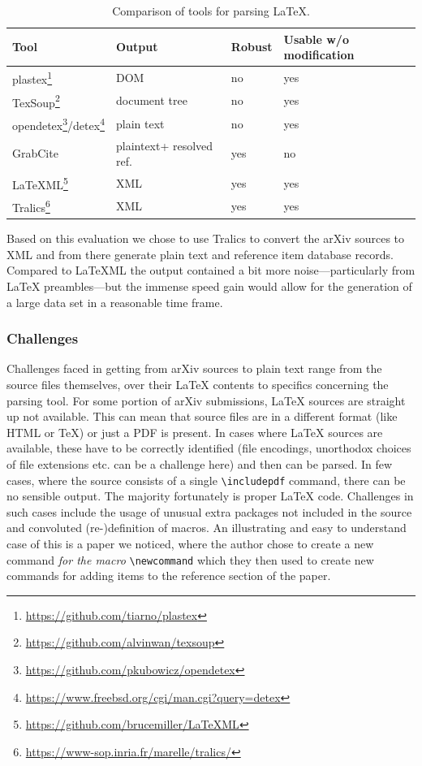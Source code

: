 \begin{table}
\centering
  \caption{Comparison of tools for parsing \LaTeX{}.}
  \label{tbl:tools}
\begin{tabular}{llll}
\toprule
    Tool & Output & Robust & Usable w/o modification \\
   \midrule
    plastex\footnote{\url{https://github.com/tiarno/plastex}} & DOM & no & yes\\
    TexSoup\footnote{\url{https://github.com/alvinwan/texsoup}} & document tree & no & yes\\
    opendetex\footnote{\url{https://github.com/pkubowicz/opendetex}}/detex\footnote{\url{https://www.freebsd.org/cgi/man.cgi?query=detex}} & plain text & no & yes\\
    GrabCite~\cite{Faerber2018} & plain\hphantom{ }text\hphantom{ }+ resolved ref. & yes & no\\
    LaTeXML\footnote{\url{https://github.com/brucemiller/LaTeXML}} & XML & yes & yes\\
    Tralics\footnote{\url{https://www-sop.inria.fr/marelle/tralics/}} & XML & yes & yes\\
  \bottomrule
\end{tabular}
\end{table}

Based on this evaluation we chose to use Tralics to convert the arXiv sources to XML and from there generate plain text and reference item database records. Compared to LaTeXML the output contained a bit more noise---particularly from LaTeX preambles---but the immense speed gain would allow for the generation of a large data set in a reasonable time frame.

\subsubsection{Challenges}
Challenges faced in getting from arXiv sources to plain text range from the source files themselves, over their LaTeX contents to specifics concerning the parsing tool. For some portion of arXiv submissions, LaTeX sources are straight up not available. This can mean that source files are in a different format (like HTML or TeX) or just a PDF is present. In cases where LaTeX sources are available, these have to be correctly identified (file encodings, unorthodox choices of file extensions etc. can be a challenge here) and then can be parsed. In few cases, where the source consists of a single \texttt{\textbackslash includepdf} command, there can be no sensible output. The majority fortunately is proper LaTeX code. Challenges in such cases include the usage of unusual extra packages not included in the source and convoluted (re-)definition of macros. An illustrating and easy to understand case of this is a paper we noticed, where the author chose to create a new command \emph{for the macro} \texttt{\textbackslash newcommand} which they then used to create new commands for adding items to the reference section of the paper.

